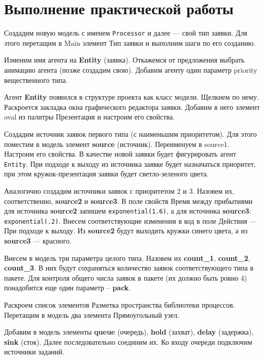 \section*{\LARGE Выполнение практической работы}
Создадим новую модель с именем \texttt{Processor} и далее
--- свой тип заявки. Для этого перетащим в Main
элемент Тип заявки и выполним шаги по его
созданию.\par
Изменим имя агента на \textbf{Entity} (заявка). Откажемся от
предложения выбрать анимацию агента (позже создадим
свою). Добавим агенту один параметр priority
вещественного типа.\par
Агент \textbf{Entity} появился в структуре проекта как класс
модели. Щелкнем по нему. Раскроется закладка окна
графического редактора заявки. Добавим в него элемент
oval из палитры Презентация и настроим его свойства.\par
Создадим источник заявок первого типа (с
наименьшим приоритетом). Для этого поместим в модель
элемент \textbf{source} (источник). Переименуем в source1.
Настроим его свойства. В качестве новой заявки будет
фигурировать агент \texttt{Entity}. При подходе к выходу из
источника заявке будет назначаться приоритет, при этом
кружок-презентация заявки будет светло-зеленого цвета.\par
Аналогично создадим источники заявок с
приоритетом 2 и 3. Назовем их, соответственно, \textbf{source2} и
\textbf{source3}. В поле свойств Время между прибытиями для
источника \textbf{source2} запишем \texttt{exponential(1.6)}, а для
источника \textbf{source3}: \texttt{exponential(.2)}. Внесем соответствующие
изменения в код в поле Действия --- При подходе к выходу.
Из \textbf{source2} будут выходить кружки синего цвета, а из
\textbf{source3} --- красного.\par
Внесем в модель три параметра целого типа.
Назовем их \textbf{count\_1}, \textbf{count\_2}, \textbf{count\_3}.
В них будут сохраняться количество заявок соответствующего типа в
пакете. Для контроля общего числа заявок в пакете (их
должно быть ровно 4) понадобится еще один параметр –
\textbf{pack}.\par
Раскроем список элементов Разметка
пространства библиотеки процессов. Перетащим в модель
два элемента Прямоугольный узел.\par
Добавим в модель элементы \textbf{queue} (очередь), \textbf{hold}
(захват), \textbf{delay} (задержка), \textbf{sink} (сток). Далее
последовательно соединим их. Ко входу очереди подключим
источники заданий.\par
